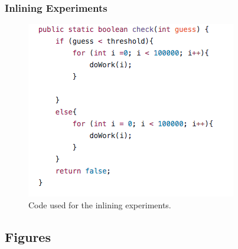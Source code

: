\pagebreak


\subsubsection{Inlining Experiments}
\begin{figure}[h]
\includegraphics[width=.7\linewidth]{code/inline.png}
\caption{Code used for the inlining experiments.}
\end{figure}

\pagebreak


\subsection{Figures}

